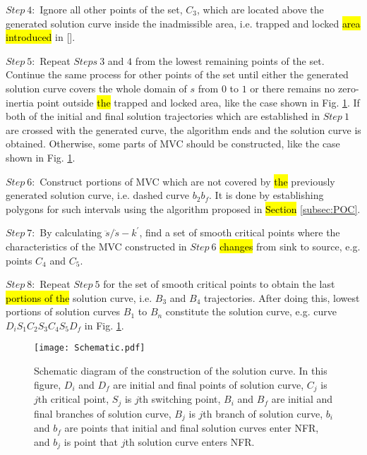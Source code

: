 \documentclass{rob}%
\begin{document}
$ Step \ 4: $
Ignore all other points of the set, $ C_3 $, which are located above the generated solution curve inside the inadmissible area, i.e. trapped and locked \hl{area introduced} in [].


$ Step \ 5: $
Repeat $ Steps \ 3 $ and $ 4 $ from the lowest remaining points of the set. %
Continue the same process for other points of the set until either the generated solution curve covers the whole domain of $ s $ from $ 0 $ to $ 1 $ or there remains no zero-inertia point outside \hl{the} trapped and locked area, like the case shown in Fig. \ref{fig:Schematic}. If both of the initial and final solution trajectories which are established in $ Step \ 1 $ are crossed with the generated curve, the algorithm ends and the solution curve is obtained. Otherwise, some parts of MVC should be constructed, like the case shown in Fig. \ref{fig:Schematic}.

$ Step \ 6: $
Construct portions of MVC which are not covered by \hl{the} previously generated solution curve, i.e. dashed curve $ b_2b_f $. It is done by establishing polygons for such intervals using the algorithm proposed in \hl{Section} \ref{subsec:POC}.

$ Step \ 7: $
By calculating $ \ddot s/\dot s - k^\prime $, find a set of smooth critical points where the characteristics of the MVC constructed in $ Step \ 6 $ \hl{changes} from sink to source, e.g. points $ C_4 $ and $ C_5 $.

$ Step \ 8: $
Repeat $ Step \ 5 $ for the set of smooth critical points to obtain the last \hl{portions of the} solution curve, i.e. $ B_3 $ and $ B_4 $ trajectories. After doing this, lowest portions of solution curves $ B_1 $ to $ B_{n} $ constitute the solution curve, e.g. curve $ D_iS_1C_2S_3C_4S_5D_f $ in Fig. \ref{fig:Schematic}.

\begin{figure}[!t]
	\centering
	\texttt{[image: Schematic.pdf]}
	\caption[Schematic diagram of the construction of the solution curve.]{Schematic diagram of the construction of the solution curve. In this figure,
		$ D_i $ and $ D_f $ are initial and final points of solution curve,
		$ C_j $ is $ j $th critical point, 
		$ S_j $ is $ j $th switching point, 
		$ B_i $ and $ B_f $ are initial and final branches of solution curve, 
		$ B_j $ is $ j $th branch of solution curve, 
		$ b_i $ and $ b_f $ are points that initial and final solution curves enter NFR, and
		$ b_j $ is point that $ j $th solution curve enters NFR.
	}
	\label{fig:Schematic}
\end{figure}
\end{document}
